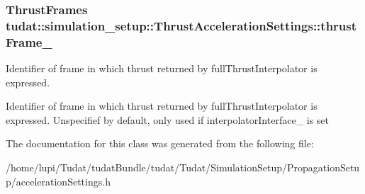 \subsubsection[{\texorpdfstring{thrust\+Frame\+\_\+}{thrustFrame_}}]{\setlength{\rightskip}{0pt plus 5cm}Thrust\+Frames tudat\+::simulation\+\_\+setup\+::\+Thrust\+Acceleration\+Settings\+::thrust\+Frame\+\_\+}\hypertarget{classtudat_1_1simulation__setup_1_1ThrustAccelerationSettings_a769892c0ff68a3a332aee38e5395790b}{}\label{classtudat_1_1simulation__setup_1_1ThrustAccelerationSettings_a769892c0ff68a3a332aee38e5395790b}


Identifier of frame in which thrust returned by full\+Thrust\+Interpolator is expressed. 

Identifier of frame in which thrust returned by full\+Thrust\+Interpolator is expressed. Unspecifief by default, only used if interpolator\+Interface\+\_\+ is set 

The documentation for this class was generated from the following file\+:\begin{DoxyCompactItemize}
\item 
/home/lupi/\+Tudat/tudat\+Bundle/tudat/\+Tudat/\+Simulation\+Setup/\+Propagation\+Setup/acceleration\+Settings.\+h\end{DoxyCompactItemize}
